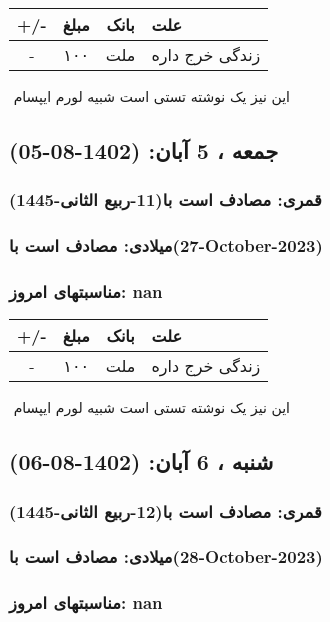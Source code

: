 \documentclass{article}
\newcommand{\rnote}[1]{\marginpar{\textcolor{color}{\StrSubstitute{\##1}{ }{\_}}}}
\newcommand{\myRow}[4]{
    #1 & #2 & #3 & #4 \\ \hline
}
\begin{document}
\begin{tabular}{ | c | c | c | p{5cm} |}
    \hline
    \myRow{ +/- }{مبلغ}{بانک}{علت}
    \myRow{-}{۱۰۰}{ملت}{زندگی خرج داره}
\end{tabular}
\newline
\newline

‌
\rnote{تست}
این نیز یک نوشته تستی است شبیه لورم ایپسام




\newpage
{}
\textcolor{color}{
\section{ جمعه ، 5 آبان: (1402-08-05) }
\subsubsection*{قمری: مصادف است با(11-ربیع الثانی-1445)} 
\subsubsection*{میلادی: مصادف است با(27-October-2023)}
\subsubsection*{مناسبتهای امروز: nan}
}


\begin{tabular}{ | c | c | c | p{5cm} |}
    \hline
    \myRow{ +/- }{مبلغ}{بانک}{علت}
    \myRow{-}{۱۰۰}{ملت}{زندگی خرج داره}
\end{tabular}
\newline
\newline

‌
\rnote{تست}
این نیز یک نوشته تستی است شبیه لورم ایپسام




\newpage
{}
\textcolor{color}{
\section{ شنبه ، 6 آبان: (1402-08-06) }
\subsubsection*{قمری: مصادف است با(12-ربیع الثانی-1445)} 
\subsubsection*{میلادی: مصادف است با(28-October-2023)}
\subsubsection*{مناسبتهای امروز: nan}
}
\end{document}
